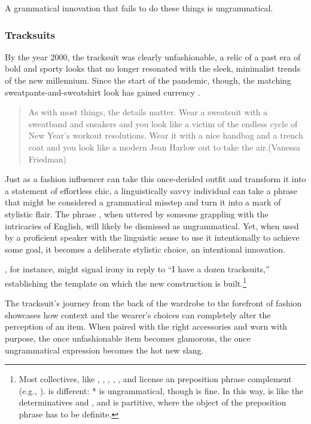 A grammatical innovation that fails to do these things is ungrammatical.

\subsubsection{Tracksuits}

By the year 2000, the tracksuit was clearly unfashionable, a relic of a past era of bold and sporty looks that no longer resonated with the sleek, minimalist trends of the new millennium. Since the start of the pandemic, though, the matching sweatpants-and-sweatshirt look has gained currency \citep{friedman2024}.

\begin{quote}
    As with most things, the details matter. Wear a sweatsuit with a sweatband and sneakers and you look like a victim of the endless cycle of New Year's workout resolutions. Wear it with a nice handbag and a trench coat and you look like a modern Jean Harlow out to take the air.\hfill(Vanessa Friedman)
\end{quote}

Just as a fashion influencer can take this once-derided outfit and transform it into a statement of effortless chic, a linguistically savvy individual can take a phrase that might be considered a grammatical misstep and turn it into a mark of stylistic flair. The phrase , when uttered by someone grappling with the intricacies of English, will likely be dismissed as ungrammatical. Yet, when used by a proficient speaker with the linguistic sense to use it intentionally to achieve some goal, it becomes a deliberate stylistic choice, an intentional innovation.

, for instance, might signal irony in reply to ``I have a dozen tracksuits,''  establishing the template on which the new  construction is built.\footnote{Most collectives, like , , , , , and  license an  preposition phrase complement (e.g., ).  is different: * is ungrammatical, though  is fine. In this way,  is like the determinatives  and , and  is partitive, where the object of the  preposition phrase has to be definite.}

The tracksuit's journey from the back of the wardrobe to the forefront of fashion showcases how context and the wearer's choices can completely alter the perception of an item. When paired with the right accessories and worn with purpose, the once unfashionable item becomes glamorous, the once ungrammatical expression becomes the hot new slang.

